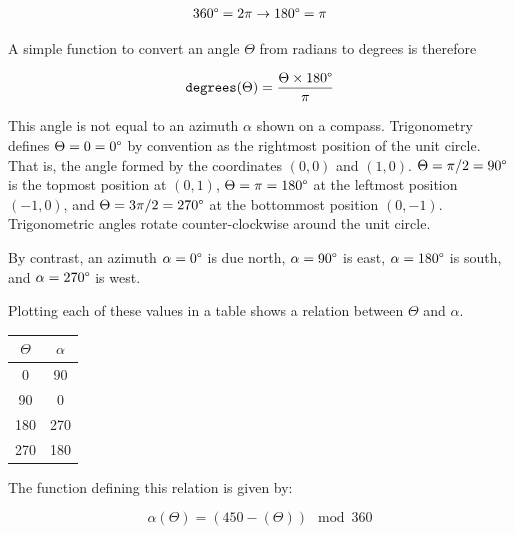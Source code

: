 \documentclass{book}
\begin{document}
\begin{equation}
360\degree = 2\pi \to 180\degree = \pi
\end{equation}

A simple function to convert an angle $\Theta$ from radians to degrees is therefore

\begin{equation}
\texttt{degrees}(\Theta) = \frac{\Theta \times 180\degree}{\pi}
\end{equation}

This angle is not equal to an azimuth $\alpha$ shown on a compass. Trigonometry defines $\Theta=0=0\degree$ by convention as the rightmost position of the unit circle. That is, the angle formed by the coordinates $(0,0)$ and $(1,0)$. $\Theta = \pi/2 = 90\degree$ is the topmost position at $(0,1)$, $\Theta = \pi = 180\degree$ at the leftmost position $(-1,0)$, and $\Theta = {3\pi}/2 = 270\degree$ at the bottommost position $(0,-1)$. Trigonometric angles rotate counter-clockwise around the unit circle.

By contrast, an azimuth $\alpha = 0\degree$ is due north, $\alpha = 90\degree$ is east, $\alpha = 180\degree$ is south, and $\alpha = 270\degree$ is west.

Plotting each of these values in a table shows a relation between $\Theta$ and $\alpha$.

\begin{center}
\begin{tabular}{c | c}
$\Theta$ & $\alpha$ \\
\hline
0 & 90 \\
90 & 0 \\
180 & 270 \\
270 & 180 \\
\end{tabular}
\end{center}

The function defining this relation is given by:

\begin{equation}
\alpha(\Theta) = (450 - (\Theta)) \mod{360}
\end{equation}



\end{document}
